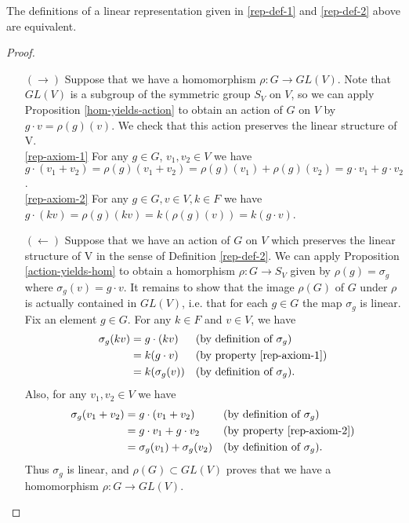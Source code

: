 
 \begin{prop}
The definitions of a linear representation given in \ref{rep-def-1} and \ref{rep-def-2} above are equivalent.
 \end{prop}
 \begin{proof}
 \begin{itemize}
\item[$(\rightarrow)$]  Suppose that we have a homomorphism $\rho \colon G \to GL(V)$.  Note that $GL(V)$ is a subgroup of the symmetric group $S_V$ on $V$, so we can apply Proposition \ref{hom-yields-action} to obtain an action of $G$ on $V$ by $g \cdot v = \rho(g)(v)$.  We check that this action preserves the linear structure of V.
\\\ref{rep-axiom-1} \quad For any $g \in G$, $v_1, v_2 \in V$ we have $g \cdot (v_1 +  v_2) = \rho(g) (v_1 + v_2) = \rho(g)(v_1) + \rho(g)(v_2)= g \cdot v_1 + g \cdot v_2$.
\\\ref{rep-axiom-2} \quad For any $g \in G, v \in V, k \in F$ we have $g \cdot (kv) = \rho(g)(kv) = k (\rho(g)(v)) = k (g \cdot v)$.
\item[$(\leftarrow)$] Suppose that we have an action of $G$ on $V$ which preserves the linear structure of V in the sense of Definition \ref{rep-def-2}.  We can apply Proposition \ref{action-yields-hom} to obtain a homorphism $\rho \colon G \to S_V$ given by $\rho(g) = \sigma_g$ where $\sigma_g(v) = g \cdot v $.  It remains to show that the image $\rho(G)$ of $G$ under $\rho$ is actually contained in $GL(V)$, i.e. that for each $g \in G$ the map $\sigma_g$ is linear.  Fix an element $g \in G$. For any $k \in F$ and $v \in V$, we have
\begin{align*}
\sigma_g (kv) &= g \cdot (kv) && \text{(by definition of $\sigma_g$)} \\
		&= k (g \cdot v) && \text{(by property \ref{rep-axiom-1})} \\
		&= k (\sigma_g (v)) && \text{(by definition of $\sigma_g$)}.
\end{align*}
Also, for any $v_1, v_2 \in V$ we have
\begin{align*}
\sigma_g (v_1 + v_2) &= g \cdot (v_1 + v_2) && \text{(by definition of $\sigma_g$)} \\
		&= g \cdot v_1 + g \cdot v_2 && \text{(by property \ref{rep-axiom-2})} \\
		&= \sigma_g(v_1) + \sigma_g(v_2) && \text{(by definition of $\sigma_g$)}.
\end{align*}
Thus $\sigma_g$ is linear, and $\rho(G) \subset GL(V)$ proves that we  have a homomorphism $\rho \colon G \to GL(V)$.

\end{itemize}
 \end{proof}
